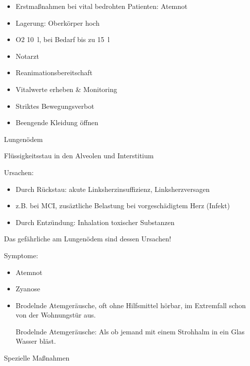 \documentclass{article}
\begin{document}
\begin{itemize}
\item Erstma{\ss}nahmen bei vital bedrohten Patienten: Atemnot

\end{itemize}
\begin{itemize}
\item Lagerung: Oberk\"orper hoch

\item O2 10~l, bei Bedarf bis zu 15~l

\item Notarzt

\item Reanimationsbereitschaft

\end{itemize}
\begin{itemize}
\item Vitalwerte erheben \& Monitoring 

\item Striktes Bewegungsverbot

\item Beengende Kleidung \"offnen

\end{itemize}
\label{bkm:RefHeading36561325}Lungen\"odem

Fl\"ussigkeitsstau in den Alveolen und Interstitium

Ursachen:

\begin{itemize}
\item Durch R\"uckstau: akute Linksherzinsuffizienz, Linksherzversagen

\item z.B. bei MCI, zus\"aztliche Belastung bei vorgesch\"adigtem Herz
(Infekt)

\item Durch Entz\"undung: Inhalation toxischer Substanzen

\end{itemize}
Das gef\"ahrliche am Lungen\"odem sind dessen Ursachen!

Symptome:

\begin{itemize}
\item Atemnot

\item Zyanose

\item {}Brodelnde Atemger\"ausche, oft
ohne Hilfsmittel h\"orbar, im Extremfall schon von der Wohnungst\"ur
aus.

\begin{center}
\begin{minipage}{4.2cm}
Brodelnde Atemger\"ausche: Als ob jemand mit einem Strohhalm in ein Glas
Wasser bl\"ast.

\end{minipage}
\end{center}
\end{itemize}
Spezielle Ma{\ss}nahmen
\end{document}
